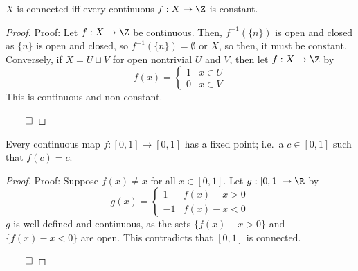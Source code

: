 
\begin{lemma}
    $X$ is connected iff every continuous $f : X \to \Z$ is constant.
\end{lemma}
\begin{proof}{Proof:}
    Let $f : X \to \Z$ be continuous. Then, $f^{-1}(\{n\})$ is open and closed as $\{n\}$ is open and closed, so $f^{-1}(\{n\}) = \emptyset$ or $X$, so then, it must be constant.\\

    Conversely, if $X = U \sqcup V$ for open nontrivial $U$ and $V$, then let $f : X \to \Z$ by
    \[ f(x) = \left\{\begin{matrix} 1 & x \in U \\ 0 & x \in V \end{matrix}\right. \]
    This is continuous and non-constant.

    $\qed$
\end{proof}

\begin{lemma}
    Every continuous map $f : [0, 1] \to [0, 1]$ has a fixed point; i.e.\ a $c \in [0, 1]$ such that $f(c) = c$.
\end{lemma}
\begin{proof}{Proof:}
    Suppose $f(x) \neq x$ for all $x \in [0, 1]$. Let $g : [0, 1] \to \R$ by
    \[ g(x) = \left\{\begin{matrix} 1 & f(x) - x > 0 \\ -1 & f(x) - x < 0 \end{matrix}\right. \]
    $g$ is well defined and continuous, as the sets $\{f(x) - x > 0\}$ and $\{f(x) - x < 0\}$ are open. This contradicts that $[0, 1]$ is connected.

    $\qed$
\end{proof}

